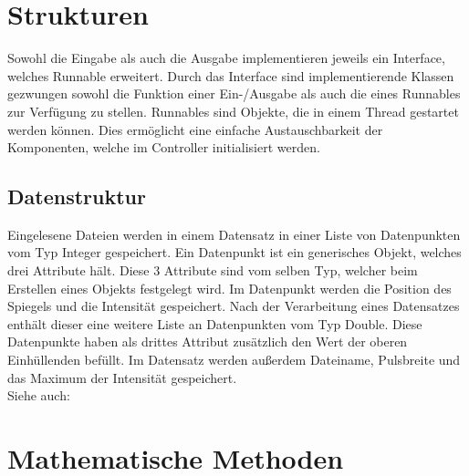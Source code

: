 \section{Strukturen}\label{subsec:strukturen}
Sowohl die Eingabe als auch die Ausgabe implementieren jeweils ein Interface, welches Runnable erweitert.
Durch das Interface sind implementierende Klassen gezwungen sowohl die Funktion einer Ein-/Ausgabe als auch die eines Runnables zur Verfügung zu stellen.
Runnables sind Objekte, die in einem Thread gestartet werden können.
Dies ermöglicht eine einfache Austauschbarkeit der Komponenten, welche im Controller initialisiert werden.

\subsection{Datenstruktur}\label{subsec:datenstruktur}
Eingelesene Dateien werden in einem Datensatz in einer Liste von Datenpunkten vom Typ Integer gespeichert.
Ein Datenpunkt ist ein generisches Objekt, welches drei Attribute hält.
Diese 3 Attribute sind vom selben Typ, welcher beim Erstellen eines Objekts festgelegt wird.
Im Datenpunkt werden die Position des Spiegels und die Intensität gespeichert.
Nach der Verarbeitung eines Datensatzes enthält dieser eine weitere Liste an Datenpunkten vom Typ Double.
Diese Datenpunkte haben als drittes Attribut zusätzlich den Wert der oberen Einhüllenden befüllt.
Im Datensatz werden außerdem Dateiname, Pulsbreite und das Maximum der Intensität gespeichert.\\
Siehe auch:
\protect\newpage
\section{Mathematische Methoden}\label{sec:mathematische-methoden}

